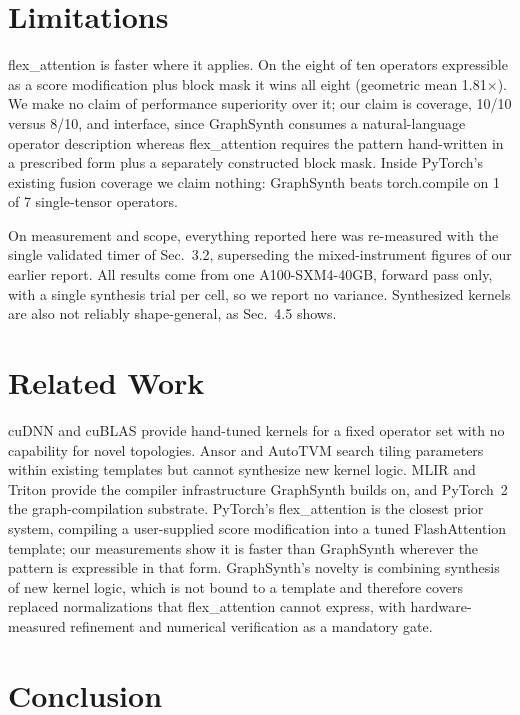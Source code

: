 \documentclass[10pt,twocolumn]{article}
\newcommand{\tc}{torch.compile}
\newcommand{\fx}{flex\_attention}
\begin{document}
\section{Limitations}

\fx{} is faster where it applies. On the eight of ten operators expressible as
a score modification plus block mask it wins all eight (geometric mean 1.81$\times$). We
make no claim of performance superiority over it; our claim is coverage, 10/10 versus
8/10, and interface, since GraphSynth consumes a natural-language operator description
whereas \fx{} requires the pattern hand-written in a prescribed form plus a separately
constructed block mask. Inside PyTorch's existing fusion coverage we claim nothing:
GraphSynth beats \tc{} on 1 of 7 single-tensor operators.

On measurement and scope, everything reported here was re-measured with the single
validated timer of Sec.~3.2, superseding the mixed-instrument figures of our earlier
report. All results come from one A100-SXM4-40GB, forward pass only, with a single
synthesis trial per cell, so we report no variance. Synthesized kernels are also not
reliably shape-general, as Sec.~4.5 shows.

\section{Related Work}

cuDNN and cuBLAS provide hand-tuned kernels for a fixed operator set with no capability
for novel topologies. Ansor and AutoTVM search tiling parameters within existing
templates but cannot synthesize new kernel logic. MLIR and Triton provide the compiler
infrastructure GraphSynth builds on, and PyTorch~2 the graph-compilation substrate.
PyTorch's \fx{} is the closest prior system, compiling a user-supplied score
modification into a tuned FlashAttention template; our measurements show it is faster
than GraphSynth wherever the pattern is expressible in that form. GraphSynth's novelty
is combining synthesis of new kernel logic, which is not bound to a template and
therefore covers replaced normalizations that \fx{} cannot express, with hardware-measured
refinement and numerical verification as a mandatory gate.

\section{Conclusion}
\end{document}

